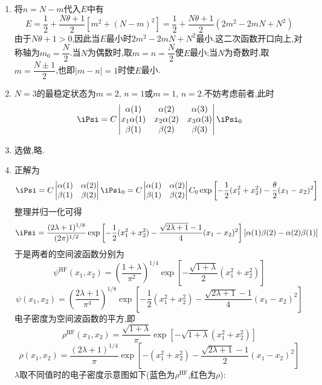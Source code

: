 \documentclass{ctexart}
\begin{document}
\begin{solution}
\begin{enumerate}[label=\tbf{(\alph*)}]
    \[E=\dfrac{1+(m^2+n^2-1)(N\theta+1)}{2}\]
    证毕.
    \item 将$n=N-m$代入$E$中有
    \[E=\dfrac12+\dfrac{N\theta+1}{2}\left[m^2+(N-m)^2\right]=\dfrac12+\dfrac{N\theta+1}{2}(2m^2-2mN+N^2)\]
    由于$N\theta+1>0$,因此当$E$最小时$2m^2-2mN+N^2$最小.这二次函数开口向上,对称轴为$m_0=\dfrac N2$.当$N$为偶数时,取$m=n=\dfrac N2$使$E$最小;当$N$为奇数时,取$m=\dfrac{N\pm1}{2}$,也即$|m-n|=1$时使$E$最小.
    \item $N=3$的最稳定状态为$m=2$, $n=1$或$m=1$, $n=2$.不妨考虑前者,此时
    \[\iPsi=C\begin{vmatrix}
        \alpha(1)&\alpha(2)&\alpha(3)\\
        x_1\alpha(1)&x_2\alpha(2)&x_3\alpha(3)\\
        \beta(1)&\beta(2)&\beta(3)
    \end{vmatrix}\iPsi_0\]
    \item 选做,略.
    \item 正解为
    \[\iPsi=C\begin{vmatrix}
        \alpha(1)&\alpha(2)\\
        \beta(1)&\beta(2)
    \end{vmatrix}\iPsi_0=C\begin{vmatrix}
        \alpha(1)&\alpha(2)\\
        \beta(1)&\beta(2)
    \end{vmatrix}C_0\exp\left[-\dfrac12(x_1^2+x_2^2)-\dfrac{\theta}{2}(x_1-x_2)^2\right]\]
    整理并归一化可得
    \[\iPsi=\dfrac{(2\lambda+1)^{1/8}}{(2\pi)^{1/2}}\exp\left[-\dfrac12(x_1^2+x_2^2)-\dfrac{\sqrt{2\lambda+1}-1}{4}(x_1-x_2)^2\right]\left[\alpha(1)\beta(2)-\alpha(2)\beta(1)\right]\]
    于是两者的空间波函数分别为
    \[\psi^{\text{HF}}(x_1,x_2)=\left(\dfrac{1+\lambda}{\pi^2}\right)^{1/4}\exp\left[-\dfrac{\sqrt{1+\lambda}}{2}\left(x_1^2+x_2^2\right)\right]\]
    \[\psi(x_1,x_2)=\left(\dfrac{2\lambda+1}{\pi^4}\right)^{1/8}\exp\left[-\dfrac12(x_1^2+x_2^2)-\dfrac{\sqrt{2\lambda+1}-1}{4}(x_1-x_2)^2\right]\]
    电子密度为空间波函数的平方,即
    \[\rho^{\text{HF}}(x_1,x_2)=\dfrac{\sqrt{1+\lambda}}{\pi}\exp\left[-\sqrt{1+\lambda}\left(x_1^2+x_2^2\right)\right]\]
    \[\rho(x_1,x_2)=\dfrac{(2\lambda+1)^{1/4}}{\pi}\exp\left[-\left(x_1^2+x_2^2\right)-\dfrac{\sqrt{2\lambda+1}-1}{2}(x_1-x_2)^2\right]\]
    $\lambda$取不同值时的电子密度示意图如下(蓝色为$\rho^{\text{HF}}$,红色为$\rho$):
    \begin{figure}[H]\centering
\end{figure}
\end{enumerate}
\end{solution}
\end{document}
